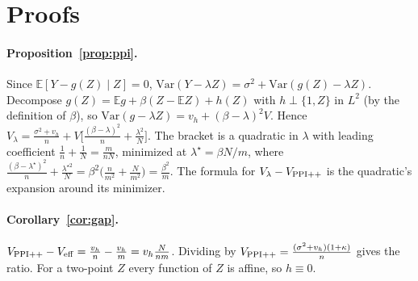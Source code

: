\section{Proofs}\label{app:proof}
\paragraph{Proposition~\ref{prop:ppi}.} Since $\mathbb E[Y-g(Z)\mid Z]=0$, $\mathrm{Var}(Y-\lambda Z)=\sigma^2+\mathrm{Var}(g(Z)-\lambda Z)$. Decompose $g(Z)=\mathbb E g+\beta(Z-\mathbb EZ)+h(Z)$ with $h\perp\{1,Z\}$ in $L^2$ (by the definition of $\beta$), so $\mathrm{Var}(g-\lambda Z)=v_h+(\beta-\lambda)^2V$. Hence $V_\lambda=\frac{\sigma^2+v_h}{n}+V\big[\frac{(\beta-\lambda)^2}{n}+\frac{\lambda^2}{N}\big]$. The bracket is a quadratic in $\lambda$ with leading coefficient $\frac1n+\frac1N=\frac m{nN}$, minimized at $\lambda^\star=\beta N/m$, where $\frac{(\beta-\lambda^\star)^2}{n}+\frac{\lambda^{\star2}}{N}=\beta^2\big(\frac{n}{m^2}+\frac{N}{m^2}\big)=\frac{\beta^2}{m}$. The formula for $V_\lambda-V_{\rm PPI++}$ is the quadratic's expansion around its minimizer.

\paragraph{Corollary~\ref{cor:gap}.} $V_{\rm PPI++}-V_{\rm eff}=\frac{v_h}{n}-\frac{v_h}{m}=v_h\frac{N}{nm}$. Dividing by $V_{\rm PPI++}=\frac{(\sigma^2+v_h)(1+\kappa)}{n}$ gives the ratio. For a two-point $Z$ every function of $Z$ is affine, so $h\equiv0$.


